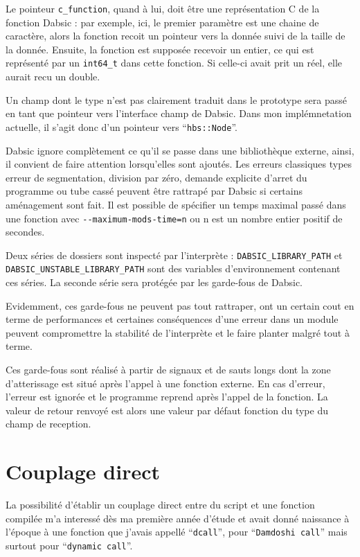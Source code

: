 \documentclass[a5paper, 12pt]{book}
\begin{document}
Le pointeur \verb!c_function!, quand à lui, doit être une représentation
C de la fonction Dabsic : par exemple, ici, le premier paramètre
est une chaine de caractère, alors la fonction recoit un pointeur
vers la donnée suivi de la taille de la donnée. Ensuite,
la fonction est supposée recevoir un entier, ce qui est représenté
par un \verb!int64_t! dans cette fonction.
Si celle-ci avait prit un réel, elle aurait recu un double.

Un champ dont le type n'est pas clairement traduit dans le
prototype sera passé en tant que pointeur vers l'interface
champ de Dabsic. Dans mon implémnetation actuelle, il s'agit
donc d'un pointeur vers ``\verb!hbs::Node!''.

Dabsic ignore complètement ce qu'il se passe dans une
bibliothèque externe, ainsi, il convient de faire attention
lorsqu'elles sont ajoutés. Les erreurs classiques
types erreur de segmentation, division par zéro, demande
explicite d'arret du programme ou tube cassé
peuvent être rattrapé par Dabsic si certains aménagement
sont fait. Il est possible de spécifier un temps maximal
passé dans une fonction avec \verb!--maximum-mods-time=n! ou n
est un nombre entier positif de secondes.

Deux séries de dossiers sont inspecté par
l'interprète : \verb!DABSIC_LIBRARY_PATH! et \verb!DABSIC_UNSTABLE_LIBRARY_PATH!
sont des variables d'environnement contenant ces séries.
La seconde série sera protégée par les garde-fous de Dabsic.

Evidemment, ces garde-fous ne peuvent pas tout rattraper,
ont un certain cout en terme de performances et certaines
conséquences d'une erreur dans un module peuvent compromettre
la stabilité de l'interprète et le faire planter malgré tout
à terme.

Ces garde-fous sont réalisé à partir de signaux et de sauts longs
dont la zone d'atterissage est situé après l'appel à une fonction
externe. En cas d'erreur, l'erreur est ignorée et le programme
reprend après l'appel de la fonction. La valeur de retour renvoyé
est alors une valeur par défaut fonction du type du champ de
reception.

\section{Couplage direct}

La possibilité d'établir un couplage direct entre du script et
une fonction compilée m'a interessé dès ma première année
d'étude et avait donné naissance à l'époque à une fonction
que j'avais appellé ``\verb!dcall!'', pour ``\verb!Damdoshi call!'' mais
surtout pour ``\verb!dynamic call!''.
\end{document}
